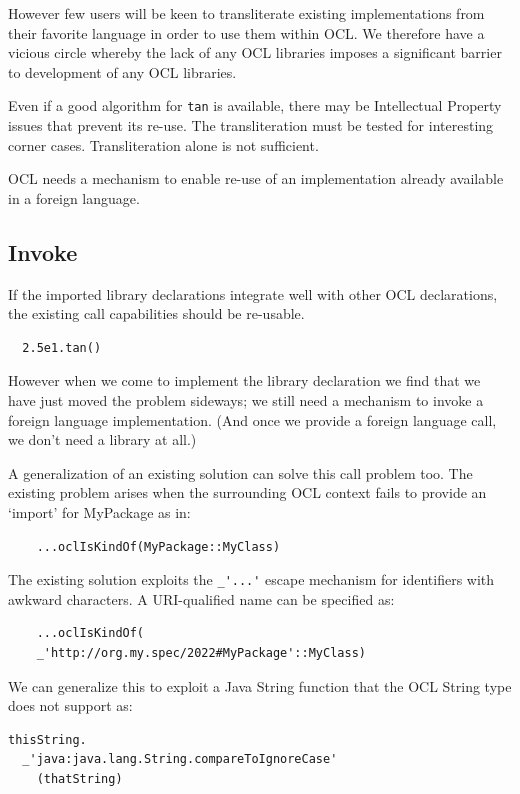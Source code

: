 \documentclass[sigconf]{acmart}
\begin{document}
However few users will be keen to transliterate existing implementations from their favorite language in order to use them within OCL. We therefore have a vicious circle whereby the lack of any OCL libraries imposes a significant barrier to development of any OCL libraries.

Even if a good algorithm for \verb|tan| is available, there may be Intellectual Property issues that prevent its re-use. The transliteration must be tested for interesting corner cases. Transliteration alone is not sufficient.

OCL needs a mechanism to enable re-use of an implementation already available in a foreign language.

\subsection{Invoke}\label{Call}  

If the imported library declarations integrate well with other OCL declarations, the existing call capabilities should be re-usable.

\begin{verbatim}
  2.5e1.tan()
\end{verbatim} 

However when we come to implement the library declaration we find that we have just moved the problem sideways; we still need a mechanism to invoke a foreign language implementation.
(And once we provide a foreign language call, we don't need a library at all.)

A generalization of an existing solution can solve this call problem too.
The existing problem arises when the surrounding OCL context fails to provide an `import' for MyPackage as in:

\begin{verbatim}
    ...oclIsKindOf(MyPackage::MyClass)
\end{verbatim} 

The existing solution exploits the \verb|_'...'| escape mechanism for identifiers with awkward characters. A URI-qualified name can be specified as:

\begin{verbatim}
    ...oclIsKindOf(
    _'http://org.my.spec/2022#MyPackage'::MyClass)
\end{verbatim} 

We can generalize this to exploit a Java String function that the OCL String type does not support as: 

\begin{verbatim}
thisString.
  _'java:java.lang.String.compareToIgnoreCase'
    (thatString)
\end{verbatim} 
\end{document}
